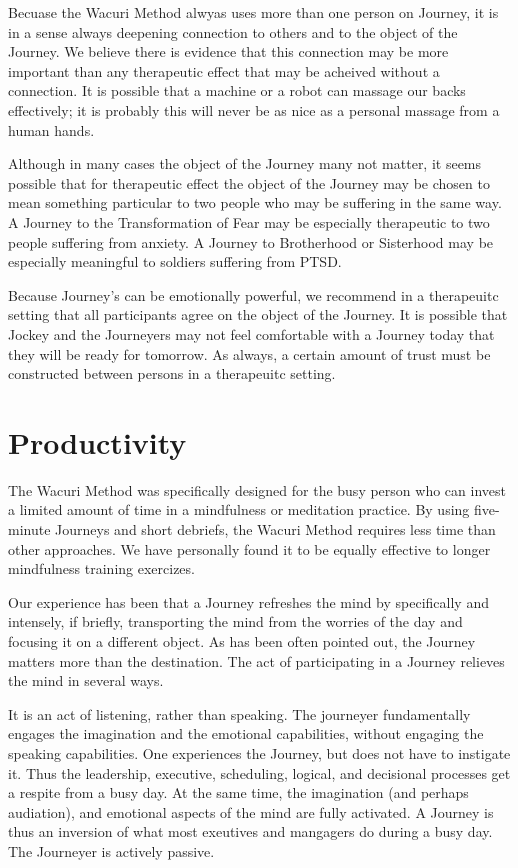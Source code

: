 \documentclass[12pt]{book}
\begin{document}
Becuase the Wacuri Method alwyas uses more than one person on Journey, it is in a sense
always deepening connection to others and to the object of the Journey. We believe there is
evidence that this connection may be more important than any therapeutic effect that may
be acheived without a connection. It is possible that a machine or a robot can massage
our backs effectively; it is probably this will never be as nice as a personal massage from a human
hands.

Although in many cases the object of the Journey many not matter, it seems possible that
for therapeutic effect the object of the Journey may be chosen to mean something particular
to two people who may be suffering in the same way. A Journey to the Transformation of Fear
may be especially therapeutic to two people suffering from anxiety. A Journey to Brotherhood or
Sisterhood may be especially meaningful to soldiers suffering from PTSD.

Because Journey's can be emotionally powerful, we recommend in a therapeuitc setting that all participants agree
on the object of the Journey. It is possible that Jockey and the Journeyers may not feel comfortable with
a Journey today that they will be ready for tomorrow. As always, a certain amount of trust must be
constructed between persons in a therapeuitc setting.

\section{Productivity}

The Wacuri Method was specifically designed for the busy person who can invest a limited amount of time
in a mindfulness or meditation practice. By using five-minute Journeys and short debriefs, the Wacuri Method
requires less time than other approaches. We have personally found it to be equally effective to longer
mindfulness training exercizes.

Our experience has been that a Journey refreshes the mind by specifically and intensely, if briefly, transporting
the mind from the worries of the day and focusing it on a different object. As has been often pointed out,
the Journey matters more than the destination. The act of participating in a Journey relieves the mind
in several ways.

It is an act of listening, rather than speaking. The journeyer fundamentally engages the imagination and
the emotional capabilities, without engaging the speaking capabilities. One experiences the Journey,
but does not have to instigate it.  Thus the leadership, executive, scheduling, logical, and decisional processes
get a respite from a busy day. At the same time, the imagination (and perhaps audiation), and emotional
aspects of the mind are fully activated. A Journey is thus an inversion of what most exeutives and
mangagers do during a busy day. The Journeyer is actively passive.
\end{document}
